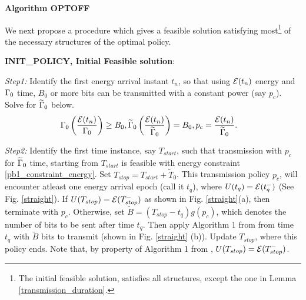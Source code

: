 
%
\textbf{Algorithm OPTOFF}

We next propose a procedure which gives a feasible solution satisfying most\footnote{The initial feasible solution, satisfies all structures, except the one in Lemma \ref{transmission_duration}.} of the necessary structures of the optimal policy.

\textbf{INIT\_POLICY, Initial Feasible solution}:

\textit{Step1:} Identify the first energy arrival instant $t_n$, so that using $\mathcal{E}(t_n)$ energy and $\Gamma_0$ time, $B_0$ or more bits can be transmitted with a constant power (say $p_c$). Solve for $\widetilde{\Gamma}_0$ below.
\begin{align}
&\TRx_0\left(\dfrac{\ETx(t_n)}{\TRx_0}\right)\ge B_0, \widetilde{\TRx}_0\left(\dfrac{\ETx(t_n)}{\widetilde{\TRx}_0}\right)= B_0, p_c = \dfrac{\ETx({t_n})}{\widetilde{\TRx}_0}.
\label{INIT_POLICY_time}
\end{align}
 
\textit{Step2:} Identify the first time instance, say $T_{start}$, such that transmission with $p_c$ for $\widetilde{\Gamma}_0$ time, starting from $T_{start}$ is feasible with energy constraint \eqref{pb1_constraint_energy}. Set $T_{stop} = T_{start} + \widetilde{T}_0$. This transmission policy $p_c$, will encounter atleast one energy arrival epoch (call it $t_q$), where $U(t_q) = \mathcal{E}(t_q^-)$ (See Fig. \ref{straight}). If $U(T_{stop}) = \mathcal{E}(T_{stop}^-)$ as shown in Fig. \ref{straight}(a), then terminate with $p_c$. Otherwise, set $\widetilde{B} = (T_{stop} - t_q)g(p_c)$, which denotes the number of bits to be sent after time $t_q$. Then apply Algorithm 1 from \cite{Yang} from time $t_q$ with $\widetilde{B}$ bits to transmit (shown in Fig. \ref{straight} (b)). Update $T_{stop}$, where this policy ends. Note that, by property of Algorithm 1 from \cite{Yang}, $U(T_{stop}) = \mathcal{E}(T_{stop}^-)$.

